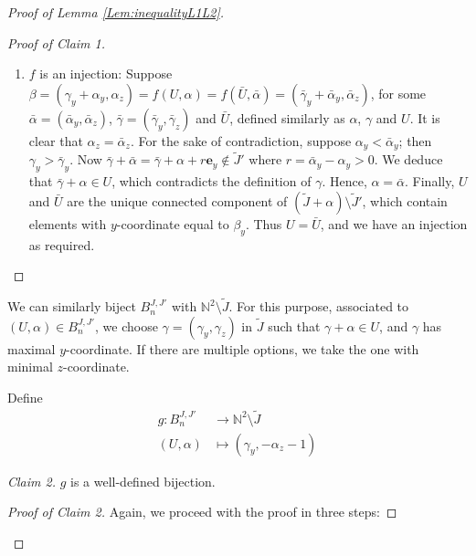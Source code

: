 \documentclass[10pt,a4paper]{amsart}
\begin{document}
\begin{proof}[Proof of Lemma \ref{Lem:inequalityL1L2}]
\begin{proof}[Proof of Claim 1]
\begin{enumerate}
     \item $f$ is an injection: Suppose $\beta=(\gamma_y+\alpha_y,\alpha_z)=f(U,\alpha)=f(\bar{U},\bar{\alpha})=(\bar{\gamma}_y+\bar{\alpha}_y,\bar{\alpha}_z)$, for some $\bar{\alpha}=(\bar{\alpha}_y,\bar{\alpha}_z)$, $\bar{\gamma}=(\bar{\gamma}_y,\bar{\gamma}_z)$ and $\bar{U}$, defined similarly as $\alpha$, $\gamma$ and $U$. It is clear that $\alpha_z=\bar{\alpha}_z$. For the sake of contradiction, suppose $\alpha_y<\bar{\alpha}_y$; then $\gamma_y>\bar{\gamma}_y$. Now $\bar{\gamma}+\bar{\alpha}=\bar{\gamma}+\alpha+r\mathbf{e}_y\notin\tilde{J}'$ where $r=\bar{\alpha}_y-\alpha_y>0$. We deduce that $\bar{\gamma}+\alpha\in U$, which contradicts the definition of $\gamma$. Hence, $\alpha=\bar{\alpha}$. Finally, $U$ and $\bar{U}$ are the unique connected component of $(\tilde{J}+\alpha)\setminus\tilde{J}'$, which contain elements with $y$-coordinate equal to $\beta_y$. Thus $U=\bar{U}$, and we have an injection as required.
\end{enumerate}
\end{proof}
 

We can similarly biject $B^{J,J'}_n$ with $\mathbb{N}^2\setminus\tilde{J}$. For  this purpose, associated to $(U,\alpha)\in B^{J,J'}_n$, we choose $\gamma=(\gamma_y,\gamma_z)$ in $\tilde{J}$ such that $\gamma+\alpha\in U$, and $\gamma$ has maximal $y$-coordinate. If there are multiple options, we take the one with minimal $z$-coordinate. 

Define
\begin{align*}
    g:B^{J,J'}_n&\rightarrow \mathbb{N}^2\setminus\tilde{J}\\
    (U,\alpha)&\mapsto (\gamma_y,-\alpha_z-1)
\end{align*}

\emph{Claim 2.} $g$ is a well-defined bijection.

\begin{proof}[Proof of Claim 2] Again, we proceed with the proof in three steps:


\end{proof}
\end{proof}
\end{document}
